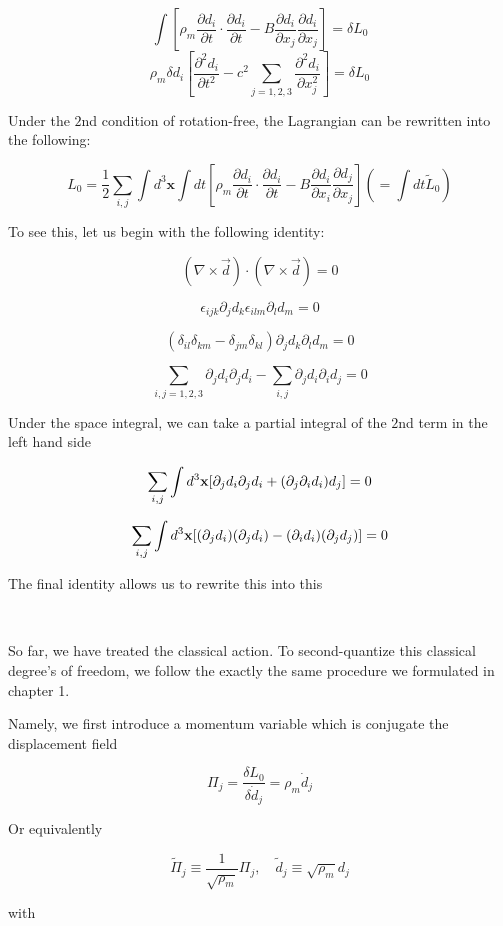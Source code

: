 \[\int \left[\rho_m\frac{\partial d_i}{\partial t}\cdot\frac{\partial d_i}{\partial t} - B\frac{\partial d_i}{\partial x_j}\frac{\partial d_i}{\partial x_j}\right] = \delta L_0\]
\[\rho_m\delta d_i\left[\frac{\partial^2 d_i}{\partial t^2} - c^2\sum_{j = 1,2,3}\frac{\partial^2 d_i}{\partial x_j^2}\right] = \delta L_0 \]

Under the $2$nd condition of rotation-free, the Lagrangian can be rewritten into the following:

\[L_0 = \frac{1}{2}\sum_{i,j}\int d^3\bm{x}\int dt \left[\rho_m\frac{\partial d_i}{\partial t}\cdot\frac{\partial d_i}{\partial t} - B\frac{\partial d_i}{\partial x_i}\frac{\partial d_j}{\partial x_j}\right] (=\int dt \tilde{L}_0) \]

To see this, let us begin with the following identity:

\[(\nabla\times\vec{d})\cdot(\nabla\times\vec{d}) = 0 \]

\[\epsilon_{ijk}\partial_j d_k\epsilon_{ilm}\partial_l d_m = 0 \]

\[(\delta_{il}\delta_{km} - \delta_{jm}\delta_{kl})\partial_j d_k\partial_l d_m = 0 \]

\[\sum_{i,j = 1,2,3} \partial_j d_i \partial_j d_i - \sum_{i,j}\partial_j d_i \partial_i d_j = 0 \]

Under the space integral, we can take a partial integral of the $2$nd term in the left hand side

\[\sum_{i,j}\int d^3{\bf x}[\partial_j d_i\partial_j d_i+(\partial_j\partial_i d_i)d_j] = 0 \]

\[\sum_{i,j}\int d^3{\bf x}[(\partial_j d_i)(\partial_j d_i) - (\partial_i d_i)(\partial_j d_j)] = 0 \]

The final identity allows us to rewrite this into this

\dotfill

\

So far, we have treated the classical action. To second-quantize this classical degree's of freedom, we follow the exactly the same procedure we formulated in chapter 1.

Namely, we first introduce a momentum variable which is conjugate the displacement field

\[\Pi_j = \frac{\delta L_0}{\delta \dot{d}_j} = \rho_m\dot{d}_j \]

Or equivalently

\[\tilde{\Pi}_j\equiv\frac{1}{\sqrt{\rho_m}}\Pi_j,\quad \tilde{d}_j\equiv\sqrt{\rho_m}d_j \]

with

